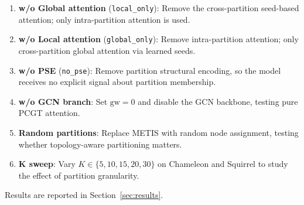 \begin{enumerate}
    \item \textbf{w/o Global attention} (\texttt{local\_only}): Remove the cross-partition seed-based attention; only intra-partition attention is used.
    \item \textbf{w/o Local attention} (\texttt{global\_only}): Remove intra-partition attention; only cross-partition global attention via learned seeds.
    \item \textbf{w/o PSE} (\texttt{no\_pse}): Remove partition structural encoding, so the model receives no explicit signal about partition membership.
    \item \textbf{w/o GCN branch}: Set $\text{gw}=0$ and disable the GCN backbone, testing pure PCGT attention.
    \item \textbf{Random partitions}: Replace METIS with random node assignment, testing whether topology-aware partitioning matters.
    \item \textbf{K sweep}: Vary $K \in \{5, 10, 15, 20, 30\}$ on Chameleon and Squirrel to study the effect of partition granularity.
\end{enumerate}

\noindent Results are reported in Section~\ref{sec:results}.
